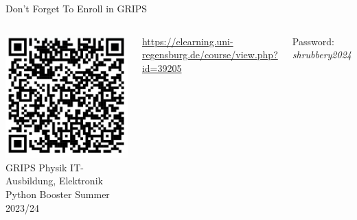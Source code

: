 
\begin{frame}{Don't Forget To Enroll in GRIPS}
%
\begin{columns}
\includegraphics[width=\linewidth]{./gfx/01-QR-GRIPS}
%
GRIPS \thus Physik \thus IT-Ausbildung, Elektronik \thus Python Booster Summer 2023/24

\vspace{6pt}
\url{https://elearning.uni-regensburg.de/course/view.php?id=39205}

\vspace{6pt}
Password: \emph{shrubbery2024}
\end{columns}
%
\end{frame}